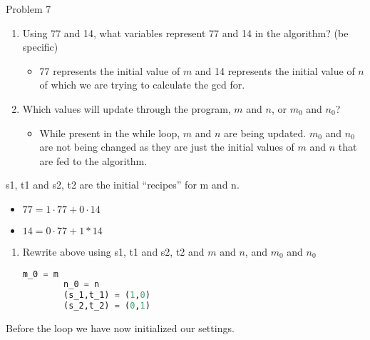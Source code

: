 \begin{problem}{Problem 7}
    \begin{highlight}[Solution]
        \begin{enumerate}
            \item Using 77 and 14, what variables represent 77 and 14 in the algorithm? (be specific)
            \begin{itemize}
                \item 77 represents the initial value of $m$ and 14 represents the initial value of $n$ of which we are trying to calculate the gcd for.
            \end{itemize}
            \item Which values will update through the program, $m$ and $n$, or $m_{0}$ and $n_{0}$?
            \begin{itemize}
                \item While present in the while loop, $m$ and $n$ are being updated. $m_{0}$ and $n_{0}$ are not being changed as they are just the initial values of $m$ and $n$ that are fed to the 
                algorithm.
            \end{itemize}
        \end{enumerate}
        s1, t1 and s2, t2 are the initial “recipes” for m and n.

        \begin{itemize}
            \item $77 = 1 \cdot 77 + 0 \cdot 14$
            \item $14 = 0 \cdot 77 + 1 * 14$
        \end{itemize}

        \begin{enumerate}[start = 3]
            \item Rewrite above using s1, t1 and s2, t2 and $m$ and $n$, and $m_{0}$ and $n_{0}$
    \begin{lstlisting}[style=stackoverflow, language=python]
        m_0 = m
        n_0 = n
        (s_1,t_1) = (1,0)
        (s_2,t_2) = (0,1)
    \end{lstlisting}
        \end{enumerate}
        Before the loop we have now initialized our settings.


\end{highlight}
\end{problem}
